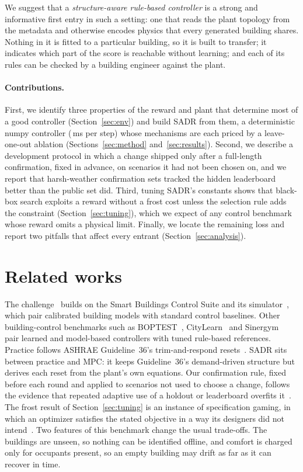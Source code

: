 \documentclass{article}
\begin{document}
We suggest that a \emph{structure-aware rule-based controller} is a strong and informative first entry in such a setting: one that reads the plant topology from the metadata and otherwise encodes physics that every generated building shares. Nothing in it is fitted to a particular building, so it is built to transfer; it indicates which part of the score is reachable without learning; and each of its rules can be checked by a building engineer against the plant.

\paragraph{Contributions.} First, we identify three properties of the reward and plant that determine most of a good controller (Section~\ref{sec:env}) and build SADR from them, a deterministic numpy controller (\PolicyMsOurs{}\,ms per step) whose mechanisms are each priced by a leave-one-out ablation (Sections~\ref{sec:method} and~\ref{sec:results}). Second, we describe a development protocol in which a change shipped only after a full-length confirmation, fixed in advance, on scenarios it had not been chosen on, and we report that harsh-weather confirmation sets tracked the hidden leaderboard better than the public set did. Third, tuning SADR's constants shows that black-box search exploits a reward without a frost cost unless the selection rule adds the constraint (Section~\ref{sec:tuning}), which we expect of any control benchmark whose reward omits a physical limit. Finally, we locate the remaining loss and report two pitfalls that affect every entrant (Section~\ref{sec:analysis}).

\section{Related works}
\label{sec:related}

The challenge~\citep{goldfeder2026smart} builds on the Smart Buildings Control Suite and its simulator~\citep{goldfeder2025suite,goldfeder2023lightweight}, which pair calibrated building models with standard control baselines. Other building-control benchmarks such as BOPTEST~\citep{blum2021boptest}, CityLearn~\citep{vazquezcanteli2019citylearn} and Sinergym~\citep{jimenezraboso2021sinergym} pair learned and model-based controllers with tuned rule-based references. Practice follows ASHRAE Guideline~36's trim-and-respond resets~\citep{ashrae2021g36,taylor2018vav}. SADR sits between practice and MPC: it keeps Guideline~36's demand-driven structure but derives each reset from the plant's own equations. Our confirmation rule, fixed before each round and applied to scenarios not used to choose a change, follows the evidence that repeated adaptive use of a holdout or leaderboard overfits it~\citep{blum2015ladder,roelofs2019meta}. The frost result of Section~\ref{sec:tuning} is an instance of specification gaming, in which an optimizer satisfies the stated objective in a way its designers did not intend~\citep{amodei2016concrete}. Two features of this benchmark change the usual trade-offs. The buildings are unseen, so nothing can be identified offline, and comfort is charged only for occupants present, so an empty building may drift as far as it can recover in time.
\end{document}
